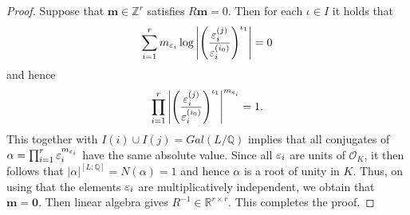 \begin{proof}
Suppose that $\mathbf{m}\in\mathbb{Z}^{r}$ satisfies $R\mathbf{m}=0$. Then for each $\iota\in I$ it holds that 
\[\sum_{i=1}^r m_{\varepsilon_i} \log\left|\left(\frac{\varepsilon_i^{(j)}}{\varepsilon_i^{(i_0)}}\right)^{\iota_1}\right| =0\] and hence 
\[\prod_{i=1}^r \left|\left(\frac{\varepsilon_i^{(j)}}{\varepsilon_i^{(i_0)}}\right)^{\iota_1}\right|^{m_{\varepsilon_i}}=1.\] This together with $I(i)\cup I(j)=Gal(L/\mathbb{Q})$ implies that all conjugates of $\alpha=\prod_{i=1}^r \varepsilon_i^{m_{\varepsilon_i}}$ have the same absolute value. Since all $\varepsilon_i$ are units of $\mathcal{O}_K$, it then follows that $|\alpha|^{[L:\mathbb{Q}]}=N(\alpha)=1$ and hence $\alpha$ is a root of unity in $K$. Thus, on using that  the elements $\varepsilon_i$ are multiplicatively independent, we obtain that $\mathbf{m}=\mathbf{0}$.  Then linear algebra gives $R^{-1}\in\mathbb{R}^{r\times r}$. This completes the proof.
\end{proof}

